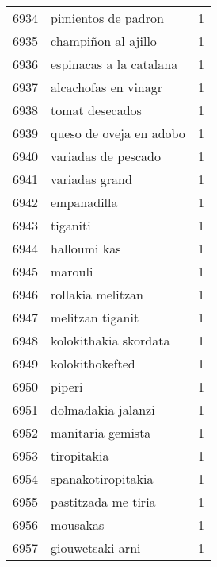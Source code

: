 \begin{tabular}{llr}
6934 &                                pimientos de padron &      1 \\
6935 &                                champiñon al ajillo &      1 \\
6936 &                            espinacas a la catalana &      1 \\
6937 &                               alcachofas en vinagr &      1 \\
6938 &                                    tomat desecados &      1 \\
6939 &                            queso de oveja en adobo &      1 \\
6940 &                                variadas de pescado &      1 \\
6941 &                                     variadas grand &      1 \\
6942 &                                        empanadilla &      1 \\
6943 &                                           tiganiti &      1 \\
6944 &                                       halloumi kas &      1 \\
6945 &                                            marouli &      1 \\
6946 &                                  rollakia melitzan &      1 \\
6947 &                                   melitzan tiganit &      1 \\
6948 &                              kolokithakia skordata &      1 \\
6949 &                                    kolokithokefted &      1 \\
6950 &                                             piperi &      1 \\
6951 &                                 dolmadakia jalanzi &      1 \\
6952 &                                  manitaria gemista &      1 \\
6953 &                                        tiropitakia &      1 \\
6954 &                                 spanakotiropitakia &      1 \\
6955 &                                pastitzada me tiria &      1 \\
6956 &                                           mousakas &      1 \\
6957 &                                   giouwetsaki arni &      1 \\

\end{tabular}
